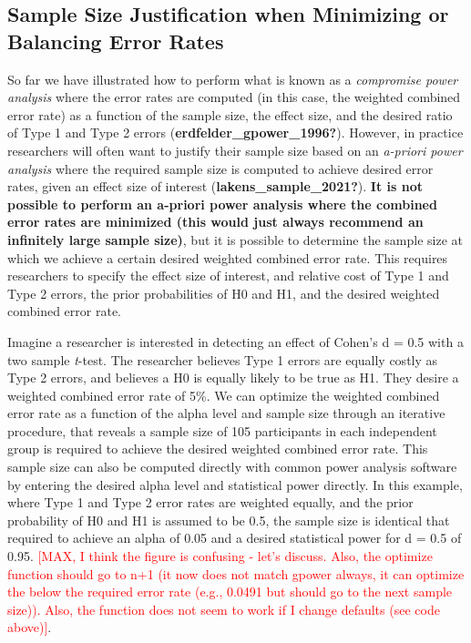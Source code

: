 \documentclass[
  english,
  ,jou, a4paper,floatsintext]{apa6}
\begin{document}
\hypertarget{sample-size-justification-when-minimizing-or-balancing-error-rates}{%
\subsection{Sample Size Justification when Minimizing or Balancing Error Rates}\label{sample-size-justification-when-minimizing-or-balancing-error-rates}}

So far we have illustrated how to perform what is known as a \emph{compromise power analysis} where the error rates are computed (in this case, the weighted combined error rate) as a function of the sample size, the effect size, and the desired ratio of Type 1 and Type 2 errors (\textbf{erdfelder\_gpower\_1996?}). However, in practice researchers will often want to justify their sample size based on an \emph{a-priori power analysis} where the required sample size is computed to achieve desired error rates, given an effect size of interest (\textbf{lakens\_sample\_2021?}). \textbf{It is not possible to perform an a-priori power analysis where the combined error rates are minimized (this would just always recommend an infinitely large sample size)}, but it is possible to determine the sample size at which we achieve a certain desired weighted combined error rate. This requires researchers to specify the effect size of interest, and relative cost of Type 1 and Type 2 errors, the prior probabilities of H0 and H1, and the desired weighted combined error rate.

Imagine a researcher is interested in detecting an effect of Cohen's d = 0.5 with a two sample \emph{t}-test. The researcher believes Type 1 errors are equally costly as Type 2 errors, and believes a H0 is equally likely to be true as H1. They desire a weighted combined error rate of 5\%. We can optimize the weighted combined error rate as a function of the alpha level and sample size through an iterative procedure, that reveals a sample size of 105 participants in each independent group is required to achieve the desired weighted combined error rate. This sample size can also be computed directly with common power analysis software by entering the desired alpha level and statistical power directly. In this example, where Type 1 and Type 2 error rates are weighted equally, and the prior probability of H0 and H1 is assumed to be 0.5, the sample size is identical that required to achieve an alpha of 0.05 and a desired statistical power for d = 0.5 of 0.95. \textcolor{red}{[MAX, I think the figure is confusing - let's discuss. Also, the optimize function should go to n+1 (it now does not match gpower always, it can optimize the below the required error rate (e.g., 0.0491 but should go to the next sample size)). Also, the function does not seem to work if I change defaults (see code above)]}.
\end{document}
